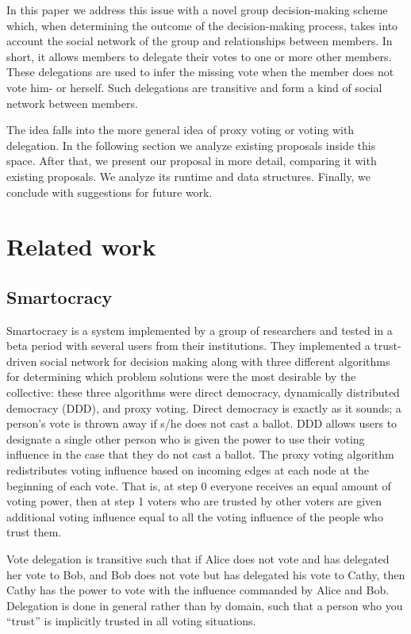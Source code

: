 \documentclass[a4paper]{acm_proc_article-sp}
\begin{document}
In this paper we address this issue with a novel group decision-making scheme which, when determining the outcome of
the decision-making process, takes into account the social network of the group and relationships between members.
In short, it allows members to delegate their votes to one or more other members. These delegations are used to infer
the missing vote when the member does not vote him- or herself. Such delegations are transitive and form a kind of
social network between members.

The idea falls into the more general idea of proxy voting or voting with delegation.  In the following section we
analyze existing proposals inside this space. After that, we present our proposal in more detail, comparing it with
existing proposals.  We analyze its runtime and data structures.  Finally, we conclude with suggestions for future work.

\section{Related work}

\subsection{Smartocracy}

Smartocracy is a system implemented by a group of researchers and tested in a beta period with several users from their
institutions.  They implemented a trust-driven social network for decision making along with three different algorithms
for determining which problem solutions were the most desirable by the collective: these three algorithms were direct
democracy, dynamically distributed democracy (DDD), and proxy voting.  Direct democracy is exactly as it sounds;
a person's vote is thrown away if s/he does not cast a ballot.  DDD allows users to designate a single other person
who is given the power to use their voting influence in the case that they do not cast a ballot.  The proxy voting
algorithm redistributes voting influence based on incoming edges at each node at the beginning of each vote.  That
is, at step 0 everyone receives an equal amount of voting power, then at step 1 voters who are trusted by other
voters are given additional voting influence equal to all the voting influence of the people who trust them.

Vote delegation is transitive such that if Alice does not vote and has delegated her vote to Bob, and Bob does not
vote but has delegated his vote to Cathy, then Cathy has the power to vote with the influence commanded by Alice and Bob.
Delegation is done in general rather than by domain, such that a person who you ``trust'' is implicitly trusted in all
voting situations.
\end{document}
